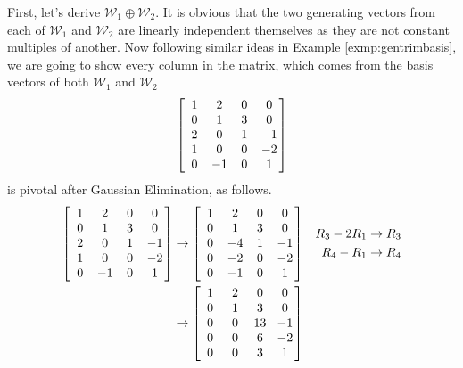 \begin{solution}
First, let's derive $\mathcal{W}_1 \oplus \mathcal{W}_2$. It is obvious that the two generating vectors from each of $\mathcal{W}_1$ and $\mathcal{W}_2$ are linearly independent themselves as they are not constant multiples of another. Now following similar ideas in Example \ref{exmp:gentrimbasis}, we are going to show every column in the matrix, which comes from the basis vectors of both $\mathcal{W}_1$ and $\mathcal{W}_2$
\begin{align*}
\left[\begin{array}{@{\;}wc{10pt}wc{10pt}wc{10pt}wc{10pt}@{\;}}
1 & 2 & 0 & 0\\
0 & 1 & 3 & 0\\
2 & 0 & 1 & -1\\
1 & 0 & 0 & -2\\
0 & -1 & 0 & 1
\end{array}\right]    
\end{align*}
is pivotal after Gaussian Elimination, as follows.
\begin{align*}
\left[\begin{array}{@{\;}wc{10pt}wc{10pt}wc{10pt}wc{10pt}@{\;}}
1 & 2 & 0 & 0\\
0 & 1 & 3 & 0\\
2 & 0 & 1 & -1\\
1 & 0 & 0 & -2\\
0 & -1 & 0 & 1
\end{array}\right]  
&\rightarrow
\left[\begin{array}{@{\;}wc{10pt}wc{10pt}wc{10pt}wc{10pt}@{\;}}
1 & 2 & 0 & 0\\
0 & 1 & 3 & 0\\
0 & -4 & 1 & -1\\
0 & -2 & 0 & -2\\
0 & -1 & 0 & 1
\end{array}\right] 
&
\begin{aligned}
R_3 - 2R_1 &\to R_3 \\
R_4 - R_1 &\to R_4
\end{aligned} \\
&\rightarrow
\left[\begin{array}{@{\;}wc{10pt}wc{10pt}wc{10pt}wc{10pt}@{\;}}
1 & 2 & 0 & 0\\
0 & 1 & 3 & 0\\
0 & 0 & 13 & -1\\
0 & 0 & 6 & -2\\
0 & 0 & 3 & 1
\end{array}\right] 
&
\begin{aligned}

\end{aligned}
\end{align*}
\end{solution}
